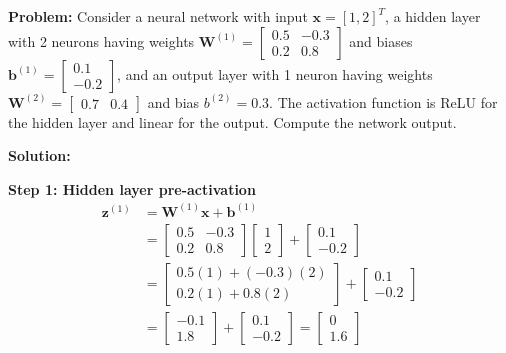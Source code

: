 \begin{examplebox}
\textbf{Problem:} Consider a neural network with input $\mathbf{x} = [1, 2]^T$, a hidden layer with 2 neurons having weights $\mathbf{W}^{(1)} = \begin{bmatrix} 0.5 & -0.3 \\ 0.2 & 0.8 \end{bmatrix}$ and biases $\mathbf{b}^{(1)} = \begin{bmatrix} 0.1 \\ -0.2 \end{bmatrix}$, and an output layer with 1 neuron having weights $\mathbf{W}^{(2)} = \begin{bmatrix} 0.7 & 0.4 \end{bmatrix}$ and bias $b^{(2)} = 0.3$. The activation function is ReLU for the hidden layer and linear for the output. Compute the network output.

\textbf{Solution:}

\textbf{Step 1: Hidden layer pre-activation}
\begin{align}
\mathbf{z}^{(1)} &= \mathbf{W}^{(1)}\mathbf{x} + \mathbf{b}^{(1)} \\
&= \begin{bmatrix} 0.5 & -0.3 \\ 0.2 & 0.8 \end{bmatrix} \begin{bmatrix} 1 \\ 2 \end{bmatrix} + \begin{bmatrix} 0.1 \\ -0.2 \end{bmatrix} \\
&= \begin{bmatrix} 0.5(1) + (-0.3)(2) \\ 0.2(1) + 0.8(2) \end{bmatrix} + \begin{bmatrix} 0.1 \\ -0.2 \end{bmatrix} \\
&= \begin{bmatrix} -0.1 \\ 1.8 \end{bmatrix} + \begin{bmatrix} 0.1 \\ -0.2 \end{bmatrix} = \begin{bmatrix} 0 \\ 1.6 \end{bmatrix}
\end{align}


\end{examplebox}
